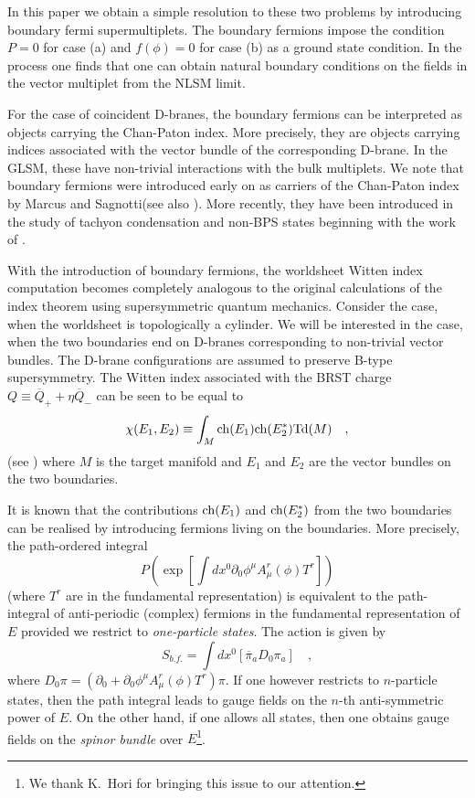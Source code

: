\documentclass[a4paper,12pt]{article}
\begin{document}
In this paper we obtain a simple resolution to these two problems by
introducing boundary fermi supermultiplets. The boundary fermions
impose the condition $P=0$ for case
(a) and $f(\phi)=0$ for case (b) as a ground state condition. In the
process one finds that one can obtain natural boundary conditions on the
fields in the vector multiplet from the NLSM limit. 


For the case of
coincident D-branes, the boundary fermions can be interpreted as objects
carrying the Chan-Paton index. More precisely, they are objects carrying
indices associated with the vector bundle of the corresponding D-brane.
In the GLSM, these have non-trivial interactions with the bulk
multiplets. We note that boundary fermions were introduced early on
as carriers of the Chan-Paton index by Marcus and Sagnotti\cite{ms}(see
also \cite{andtsyet}).
More recently, they have been introduced in the study of tachyon
condensation and non-BPS states beginning with the work of
\cite{wittenktheory,Kutasov:2000aq}.

With the introduction of boundary fermions, the worldsheet Witten 
index computation becomes completely analogous to
the original calculations of the index theorem using supersymmetric
quantum mechanics. 
Consider the case, when the worldsheet is topologically a cylinder.
We will be interested in the case, when the two boundaries end on
D-branes corresponding to non-trivial vector bundles. The D-brane
configurations are assumed to preserve B-type supersymmetry. The
Witten index associated with the BRST charge $Q\equiv 
\overline{Q}_+ +\eta \overline{Q}_-$ can be seen to be equal to
$$
\chi(E_1,E_2)\equiv \int_M {\rm ch}(E_1) {\rm ch}(E_2^*) {\rm Td} (M)
\quad,$$
(see \cite{HIV}) where $M$ is the target manifold and $E_1$ and $E_2$
are the vector bundles on the two boundaries. 

It is known that the contributions ${\rm ch}(E_1)$ and ${\rm ch}(E_2^*)$
from the two boundaries can be realised by introducing fermions living
on the boundaries. More precisely, the path-ordered integral
$$
P\left(\exp\left[\int dx^0 \partial_0 \phi^\mu A_\mu^r(\phi) T^r\right]\right)
$$ 
(where $T^r$ are in the fundamental representation) is equivalent to
the path-integral of anti-periodic (complex) fermions in the fundamental
representation of $E$ provided we restrict to {\em one-particle
states}\cite{luis}.
The action is given by 
$$
S_{b.f.}=\int dx^0 [\overline{\pi}_a D_0 \pi_a]\quad,$$
where $D_0 \pi = (\partial_0 + \partial_0 \phi^\mu A_\mu^r(\phi)
T^r)\pi$.
 If one however restricts to $n$-particle states, then the path integral
leads to gauge fields on the $n$-th anti-symmetric power of $E$. On the
other hand, if one allows all states, then one obtains gauge fields on
the {\em spinor bundle} over $E$\footnote{We thank K.~Hori for bringing
this issue to our attention.}.
\end{document}
